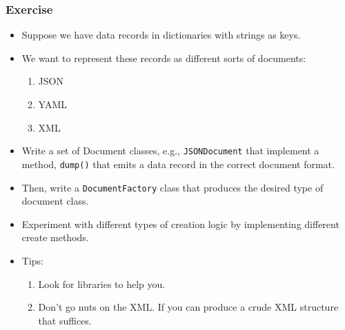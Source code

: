 \documentclass[10pt]{beamer}
\begin{document}
\begin{frame}
	\frametitle{Exercise}

	\begin{itemize}
            \item Suppose we have data records in dictionaries
		    with strings as keys.
	    \item We want to represent these records as different
		    sorts of documents:
		    \begin{enumerate}
			    \item JSON
			    \item YAML
			    \item XML
		    \end{enumerate}
	    \item Write a set of Document classes, e.g.,
		    \texttt{JSONDocument} that implement a method,
		    \texttt{dump()} that emits a data record in the 
		    correct document format.
	    \item Then, write a \texttt{DocumentFactory} class that
		    produces the desired type of document class.
	    \item Experiment with different types of creation logic by
		    implementing different create methods.
	    \item Tips:
		    \begin{enumerate}
			    \item Look for libraries to help you.
			    \item Don't go nuts on the XML. If you 
				    can produce a crude XML structure
				    that suffices.
		    \end{enumerate}
	\end{itemize}

\end{frame}
\end{document}
